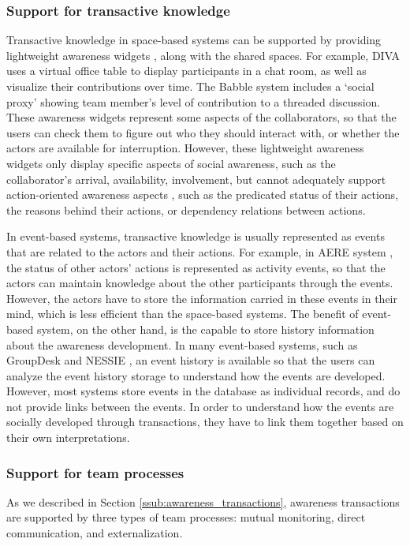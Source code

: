 \subsubsection{Support for transactive knowledge} %
\label{ssub:support_for_transactive_knowledge}
Transactive knowledge in space-based systems can be supported by providing lightweight awareness widgets \cite{Gutwin1996}, along with the shared spaces. For example, DIVA uses a virtual office table to display participants in a chat room, as well as visualize their contributions over time\cite{Berlage1999}. The Babble system \cite{Erickson1999} includes a `social proxy' showing team member's level of contribution to a threaded discussion. These awareness widgets represent some aspects of the collaborators, so that the users can check them to figure out who they should interact with, or whether the actors are available for interruption. However, these lightweight awareness widgets only display specific aspects of social awareness, such as the collaborator's arrival, availability, involvement, but cannot adequately support action-oriented awareness aspects \cite{carroll2003a}, such as the predicated status of their actions, the reasons behind their actions, or dependency relations between actions.

In event-based systems, transactive knowledge is usually represented as events that are related to the actors and their actions. For example, in AERE system \cite{fuchs1999a}, the status of other actors' actions is represented as activity events, so that the actors can maintain knowledge about the other participants through the events. However, the actors have to store the information carried in these events in their mind, which is less efficient than the space-based systems. The benefit of event-based system, on the other hand, is the capable to store history information about the awareness development. In many event-based systems, such as GroupDesk \cite{Fuchs1995} and NESSIE \cite{prinz1999a}, an event history is available so that the users can analyze the event history storage to understand how the events are developed. However, most systems store events in the database as individual records, and do not provide links between the events. In order to understand how the events are socially developed through transactions, they have to link them together based on their own interpretations. 

\subsubsection{Support for team processes} %
\label{ssub:support_for_team_processes}
As we described in Section \ref{ssub:awareness_transactions}, awareness transactions are supported by three types of team processes: mutual monitoring, direct communication, and externalization.

